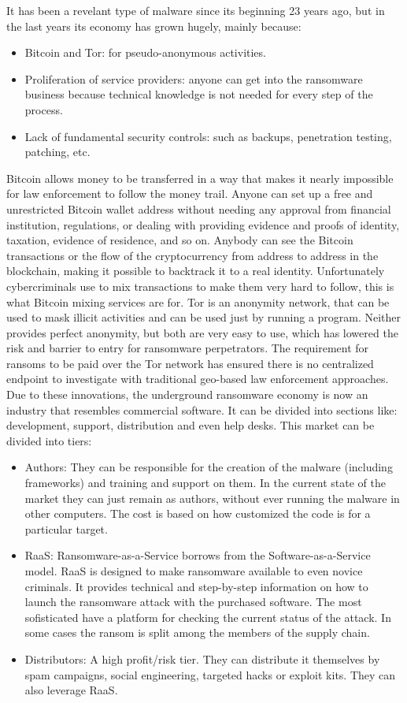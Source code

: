 It has been a revelant type of malware since its beginning 23 years ago, but in the last years its economy has grown hugely, mainly because\cite{ransomware_digital_extortion}\cite{ransomware_economy}:
\begin{itemize}
	\item Bitcoin and Tor: for pseudo-anonymous activities.
	\item Proliferation of service providers: anyone can get into the ransomware business because technical knowledge is not needed for every step of the process.
	\item Lack of fundamental security controls: such as backups, penetration testing, patching, etc.
\end{itemize}
\linej
Bitcoin allows money to be transferred in a way that makes it nearly impossible for law enforcement to follow the money trail.
Anyone can set up a free and unrestricted Bitcoin wallet address without needing any approval from financial institution, regulations, or dealing with providing evidence and proofs of identity, taxation, evidence of residence, and so on.
Anybody can see the Bitcoin transactions or the flow of the cryptocurrency from address to address in the blockchain, making it possible to backtrack it to a real identity.
Unfortunately cybercriminals use to mix transactions to make them very hard to follow, this is what Bitcoin mixing services are for.
\linej
Tor is an anonymity network, that can be used to mask illicit activities and can be used just by running a program.
\linej
Neither provides perfect anonymity, but both are very easy to use, which has lowered the risk and barrier to entry for ransomware perpetrators.
The requirement for ransoms to be paid over the Tor network has ensured there is no centralized endpoint to investigate with traditional geo-based law enforcement approaches\cite{ransomware_digital_extortion}.
\linej
\linej
Due to these innovations, the underground ransomware economy is now an industry that resembles commercial software. It can be divided into sections like: development, support, distribution and even help desks. This market can be divided into tiers\cite{ransomware_economy}:
\begin{itemize}
	\item Authors: They can be responsible for the creation of the malware (including frameworks) and training and support on them. In the current state of the market they can just remain as authors, without ever running the malware in other computers. The cost is based on how customized the code is for a particular target.
	\item RaaS: Ransomware-as-a-Service borrows from the Software-as-a-Service model. RaaS is designed to make ransomware available to even novice criminals. It provides technical and step-by-step information on how to launch the ransomware attack with the purchased software. The most sofisticated have a platform for checking the current status of the attack. In some cases the ransom is split among the members of the supply chain.
	\item Distributors: A high profit/risk tier. They can distribute it themselves by spam campaigns, social engineering, targeted hacks or exploit kits. They can also leverage RaaS.
\end{itemize}
